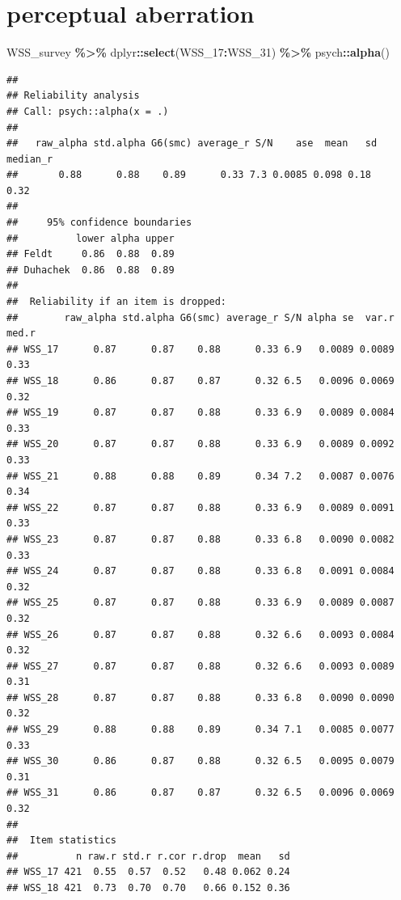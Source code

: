 \documentclass[
]{article}
\newenvironment{Shaded}{\begin{snugshade}}{\end{snugshade}}
\newcommand{\FunctionTok}[1]{\textcolor[rgb]{0.13,0.29,0.53}{\textbf{#1}}}
\newcommand{\NormalTok}[1]{#1}
\newcommand{\SpecialCharTok}[1]{\textcolor[rgb]{0.81,0.36,0.00}{\textbf{#1}}}
\begin{document}
\section{perceptual aberration}\label{perceptual-aberration}

\begin{Shaded}
\begin{Highlighting}[]
\NormalTok{WSS\_survey }\SpecialCharTok{\%\textgreater{}\%}\NormalTok{ dplyr}\SpecialCharTok{::}\FunctionTok{select}\NormalTok{(WSS\_17}\SpecialCharTok{:}\NormalTok{WSS\_31) }\SpecialCharTok{\%\textgreater{}\%}\NormalTok{ psych}\SpecialCharTok{::}\FunctionTok{alpha}\NormalTok{()}
\end{Highlighting}
\end{Shaded}

\begin{verbatim}
## 
## Reliability analysis   
## Call: psych::alpha(x = .)
## 
##   raw_alpha std.alpha G6(smc) average_r S/N    ase  mean   sd median_r
##       0.88      0.88    0.89      0.33 7.3 0.0085 0.098 0.18     0.32
## 
##     95% confidence boundaries 
##          lower alpha upper
## Feldt     0.86  0.88  0.89
## Duhachek  0.86  0.88  0.89
## 
##  Reliability if an item is dropped:
##        raw_alpha std.alpha G6(smc) average_r S/N alpha se  var.r med.r
## WSS_17      0.87      0.87    0.88      0.33 6.9   0.0089 0.0089  0.33
## WSS_18      0.86      0.87    0.87      0.32 6.5   0.0096 0.0069  0.32
## WSS_19      0.87      0.87    0.88      0.33 6.9   0.0089 0.0084  0.33
## WSS_20      0.87      0.87    0.88      0.33 6.9   0.0089 0.0092  0.33
## WSS_21      0.88      0.88    0.89      0.34 7.2   0.0087 0.0076  0.34
## WSS_22      0.87      0.87    0.88      0.33 6.9   0.0089 0.0091  0.33
## WSS_23      0.87      0.87    0.88      0.33 6.8   0.0090 0.0082  0.33
## WSS_24      0.87      0.87    0.88      0.33 6.8   0.0091 0.0084  0.32
## WSS_25      0.87      0.87    0.88      0.33 6.9   0.0089 0.0087  0.32
## WSS_26      0.87      0.87    0.88      0.32 6.6   0.0093 0.0084  0.32
## WSS_27      0.87      0.87    0.88      0.32 6.6   0.0093 0.0089  0.31
## WSS_28      0.87      0.87    0.88      0.33 6.8   0.0090 0.0090  0.32
## WSS_29      0.88      0.88    0.89      0.34 7.1   0.0085 0.0077  0.33
## WSS_30      0.86      0.87    0.88      0.32 6.5   0.0095 0.0079  0.31
## WSS_31      0.86      0.87    0.87      0.32 6.5   0.0096 0.0069  0.32
## 
##  Item statistics 
##          n raw.r std.r r.cor r.drop  mean   sd
## WSS_17 421  0.55  0.57  0.52   0.48 0.062 0.24
## WSS_18 421  0.73  0.70  0.70   0.66 0.152 0.36

\end{verbatim}
\end{document}
